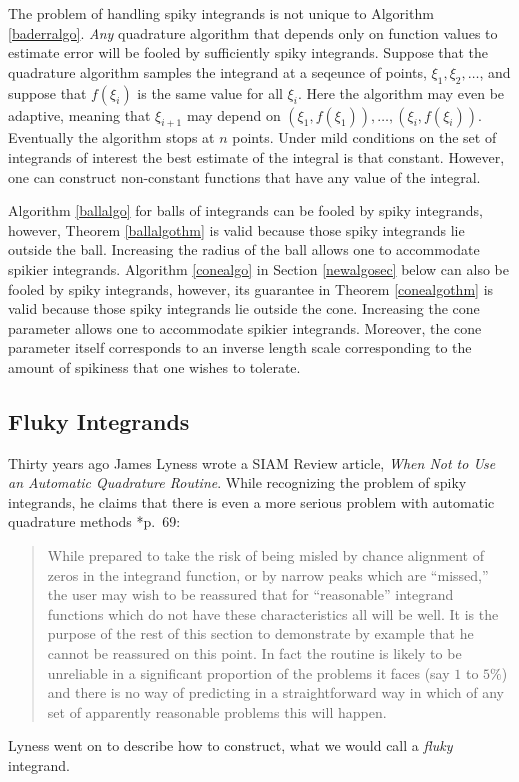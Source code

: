 \documentclass[]{amsart}
\theoremstyle{definition}
\theoremstyle{remark}
\begin{document}
The problem of handling spiky integrands is not unique to Algorithm \ref{baderralgo}.  \emph{Any} quadrature algorithm that depends only on function values to estimate error will be fooled by sufficiently spiky integrands.  Suppose that the quadrature algorithm samples the integrand at a seqeunce of points, $\xi_1, \xi_2, \ldots$, and suppose that $f(\xi_i)$ is the same value for all $\xi_i$.  Here the algorithm may even be adaptive, meaning that $\xi_{i+1}$ may depend on $(\xi_1, f(\xi_1)), \ldots, (\xi_i, f(\xi_i))$.  Eventually the algorithm stops at $n$ points.  Under mild conditions on the set of integrands of interest the best estimate of the integral is that constant. However, one can construct non-constant functions that have any value of the integral.

Algorithm \ref{ballalgo} for balls of integrands can be fooled by spiky integrands, however, Theorem \ref{ballalgothm} is valid because those spiky integrands lie outside the ball.  Increasing the radius of the ball allows one to accommodate spikier integrands.  Algorithm \ref{conealgo} in Section \ref{newalgosec} below can also be fooled by spiky integrands, however, its guarantee in Theorem \ref{conealgothm} is valid because those spiky integrands lie outside the cone.  Increasing the cone parameter allows one to accommodate spikier integrands.  Moreover, the cone parameter itself corresponds to an inverse length scale corresponding to the amount of spikiness that one wishes to tolerate.

\subsection{Fluky Integrands} \label{flukysubsec}

Thirty years ago James Lyness wrote a SIAM Review article, \emph{When Not to Use an Automatic Quadrature Routine}.  While recognizing the problem of spiky integrands, he claims that there is even a more serious problem with automatic quadrature methods   \cite{Lyn83}*{p.\ 69}:
\begin{quote}
While prepared to take the risk of being misled by chance alignment of zeros in the integrand function, or by narrow peaks which are ``missed,'' the user may wish to be reassured that for ``reasonable'' integrand functions which do not have these characteristics all will be well. It is the purpose of the rest of this section to demonstrate by example that he cannot be reassured on this point. In fact the routine is likely to be unreliable in a significant proportion of the problems it faces (say $1$ to $5\%$) and there is no way of predicting in a straightforward way in which of any set of apparently reasonable problems this will happen.
\end{quote}
Lyness went on to describe how to construct, what we would call a \emph{fluky} integrand.  
\end{document}

